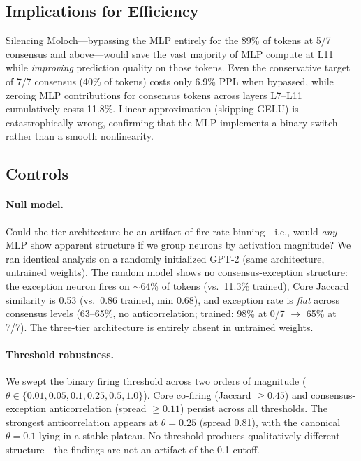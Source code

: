 \documentclass{article}
\begin{document}
\subsection{Implications for Efficiency}

Silencing Moloch---bypassing the MLP entirely for the 89\% of tokens at
5/7 consensus and above---would save the vast majority of MLP compute at
L11 while \emph{improving} prediction quality on those tokens.
Even the conservative target of 7/7 consensus (40\% of tokens) costs only
6.9\% PPL when bypassed, while zeroing MLP contributions for consensus tokens
across layers L7--L11 cumulatively costs 11.8\%.
Linear approximation (skipping GELU) is catastrophically wrong, confirming that
the MLP implements a binary switch rather than a smooth nonlinearity.

\subsection{Controls}
\label{sec:controls}

\paragraph{Null model.}
Could the tier architecture be an artifact of fire-rate binning---i.e., would
\emph{any} MLP show apparent structure if we group neurons by activation
magnitude?
We ran identical analysis on a randomly initialized GPT-2 (same architecture,
untrained weights).
The random model shows no consensus-exception structure:
the exception neuron fires on $\sim$64\% of tokens (vs.\ 11.3\% trained),
Core Jaccard similarity is 0.53 (vs.\ 0.86 trained, min 0.68),
and exception rate is \emph{flat} across consensus levels
(63--65\%, no anticorrelation; trained: 98\% at 0/7 $\to$ 65\% at 7/7).
The three-tier architecture is entirely absent in untrained weights.

\paragraph{Threshold robustness.}
\label{sec:threshold}
We swept the binary firing threshold across two orders of magnitude
($\theta \in \{0.01, 0.05, 0.1, 0.25, 0.5, 1.0\}$).
Core co-firing (Jaccard $\geq 0.45$) and consensus-exception anticorrelation
(spread $\geq 0.11$) persist across all thresholds.
The strongest anticorrelation appears at $\theta = 0.25$ (spread 0.81),
with the canonical $\theta = 0.1$ lying in a stable plateau.
No threshold produces qualitatively different structure---the findings are not
an artifact of the 0.1 cutoff.
\end{document}
